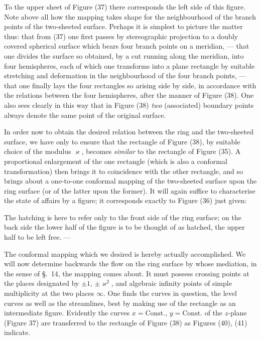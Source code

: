 \documentclass{article}
\begin{document}
To the upper sheet of Figure (37) there corresponds the left side of this figure. Note above all how the mapping takes shape for the neighbourhood of the branch points of the two-sheeted surface. Perhaps it is simplest to picture the matter thus: that from (37) one first passes by stereographic projection to a doubly covered spherical surface which bears four branch points on a meridian, --- that one divides the surface so obtained, by a cut running along the meridian, into four hemispheres, each of which one transforms into a plane rectangle by suitable stretching and deformation in the neighbourhood of the four branch points, --- that one finally lays the four rectangles so arising side by side, in accordance with the relations between the four hemispheres, after the manner of Figure (38). One also sees clearly in this way that in Figure (38) \emph{two} (associated) boundary points always denote the same point of the original surface.


In order now to obtain the desired relation between the ring and the two-sheeted surface, we have only to ensure that the rectangle of Figure (38), by suitable choice of the modulus $\varkappa$, becomes \emph{similar} to the rectangle of Figure (35). A proportional enlargement of the one rectangle (which is also a conformal transformation) then brings it to coincidence with the other rectangle, and so brings about a one-to-one conformal mapping of the two-sheeted surface upon the ring surface (or of the latter upon the former). It will again suffice to characterise the state of affairs by a figure; it corresponds exactly to Figure (36) just given:


The hatching is here to refer only to the front side of the ring surface; on the back side the lower half of the figure is to be thought of as hatched, the upper half to be left free. ---

The conformal mapping which we desired is hereby actually accomplished. We will now determine backwards the flow on the ring surface by whose mediation, in the sense of §.~14, the mapping comes about. It must possess crossing points at the places designated by $\pm 1$, $\pm \varkappa^{2}$, and algebraic infinity points of simple multiplicity at the two places $\infty$. One finds the curves in question, the level curves as well as the streamlines, best by making use of the rectangle as an intermediate figure. Evidently the curves $x = \text{Const.}$, $y = \text{Const.}$ of the $z$-plane (Figure 37) are transferred to the rectangle of Figure (38) as Figures (40), (41) indicate.
\end{document}
